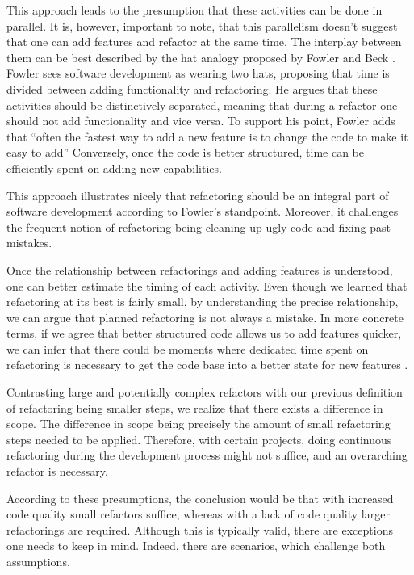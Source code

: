 This approach leads to the presumption that these activities can be done in parallel.
It is, however, important to note, 
	that this parallelism doesn't suggest that one can add features and refactor at the same time.
The interplay between them can be best described by the hat analogy proposed by Fowler and Beck \textcite[p.~47]{fowler2018}. 
Fowler sees software development as wearing two hats, 
	proposing that time is divided between adding functionality and refactoring. 
He argues that these activities should be distinctively separated, 
	meaning that during a refactor one should not add functionality and vice versa. 
To support his point, 
	Fowler adds that “often the fastest way to add a new feature is to change the code to make it easy to add” \cite[p.~53]{fowler2018} 
Conversely, once the code is better structured, 
	time can be efficiently spent on adding new capabilities.

This approach illustrates nicely that refactoring 
	should be an integral part of software development according to Fowler's standpoint.  
Moreover, it challenges the frequent notion of refactoring being 
	cleaning up ugly code and fixing past mistakes. 

Once the relationship between refactorings and adding features is understood, 
	one can better estimate the timing of each activity.
Even though we learned that refactoring at its best is fairly small, 
	by understanding the precise relationship, 
	we can argue that planned refactoring is not always a mistake.
In more concrete terms, if we agree that better structured code 
	allows us to add features quicker, 
	we can infer that there could be moments where dedicated time spent on refactoring 
	is necessary to get the code base into a better state for new features \cite[p.~53]{fowler2018}.

Contrasting large and potentially complex refactors with our previous definition of 
	refactoring being smaller steps, we realize 
	that there exists a difference in scope.
The difference in scope being precisely 
	the amount of small refactoring steps needed to be applied.
Therefore, with certain projects, doing continuous refactoring during the development process might not suffice, 
	and an overarching refactor is necessary.

According to these presumptions, the conclusion would be 
	that with increased code quality small refactors suffice, 
	whereas with a lack of code quality larger refactorings are required. 
Although this is typically valid, there are exceptions one needs to keep in mind. 
Indeed, there are scenarios, which challenge both assumptions.

